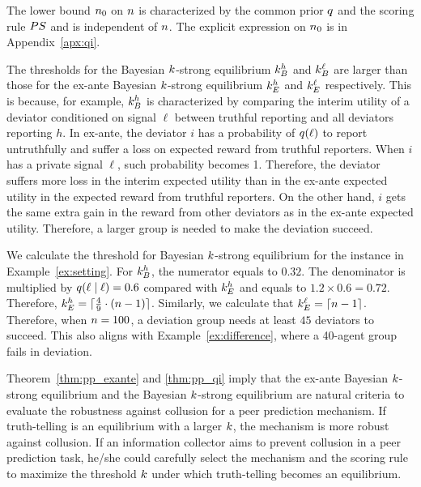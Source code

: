 The lower bound $n_0$ on $n$ is characterized by the common prior $q$ and the scoring rule $PS$ and is independent of $n$. The explicit expression on $n_0$ is in Appendix~\ref{apx:qi}.

The thresholds for the Bayesian $k$-strong equilibrium $k_B^h$ and $k_B^\ell$ are larger than those for the ex-ante Bayesian $k$-strong equilibrium $k_E^h$ and $k_E^\ell$ respectively. This is because, for example, $k_B^h$ is characterized by comparing the interim utility of a deviator conditioned on signal $\ell$ between truthful reporting and all deviators reporting $h$. In ex-ante, the deviator $i$ has a probability of $q(\ell)$ to report untruthfully and suffer a loss on expected reward from truthful reporters. When $i$ has a private signal $\ell$, such probability becomes 1. Therefore, the deviator suffers more loss in the interim expected utility than in the ex-ante expected utility in the expected reward from truthful reporters. On the other hand, $i$ gets the same extra gain in the reward from other deviators as in the ex-ante expected utility. Therefore, a larger group is needed to make the deviation succeed. 

\begin{example}
    \label{ex:qi}
    We calculate the threshold for Bayesian $k$-strong equilibrium for the instance in Example~\ref{ex:setting}. For $k_B^h$, the numerator equals to $0.32$.
    The denominator is multiplied by $q(\ell \mid \ell) = 0.6$ compared with $k_E^h$ and equals to $1.2 \times 0.6 = 0.72$. Therefore, $k_E^h = \lceil \frac{4}{9}\cdot (n-1)\rceil$. Similarly, we calculate that $k_E^\ell = \lceil n - 1 \rceil$. Therefore, when $n = 100$, a deviation group needs at least $45$ deviators to succeed. This also aligns with Example~\ref{ex:difference}, where a 40-agent group fails in deviation.  
\end{example}

Theorem~\ref{thm:pp_exante} and \ref{thm:pp_qi} imply that the ex-ante Bayesian $k$-strong equilibrium and the Bayesian $k$-strong equilibrium are natural criteria to evaluate the robustness against collusion for a peer prediction mechanism. If truth-telling is an equilibrium with a larger $k$, the mechanism is more robust against collusion. If an information collector aims to prevent collusion in a peer prediction task, he/she could carefully select the mechanism and the scoring rule to maximize the threshold $k$ under which truth-telling becomes an equilibrium.  

